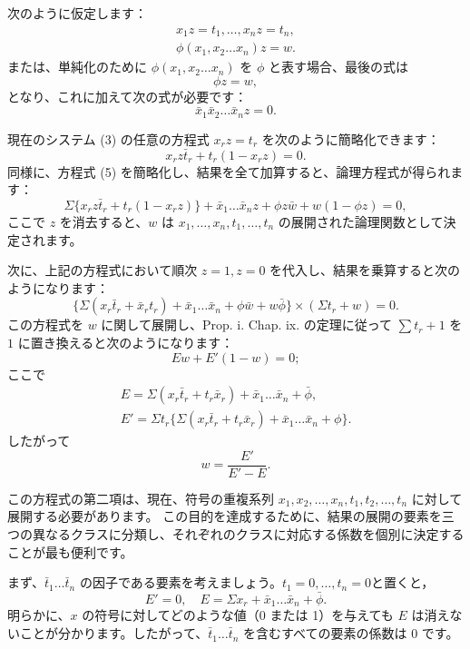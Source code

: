 \documentclass[a4paper,11pt,openany]{ltjsbook}
\begin{document}
次のように仮定します：
\begin{gather*}\tag{3}
x_1 z = t_1, \dotsc, x_n z = t_n,
\\\tag{4}
\phi(x_1, x_2 \dotsc x_n) z = w.
\end{gather*}
または、単純化のために $\phi(x_1, x_2 \dotsc x_n)$ を $\phi$ と表す場合、最後の式は
\begin{equation}\tag{5}
\phi z = w,
\end{equation}
となり、これに加えて次の式が必要です：
\begin{equation}\tag{6}
\bar{x}_1 \bar{x}_2 \dotsc \bar{x}_n z = 0.
\end{equation}

現在のシステム (3) の任意の方程式 $x_r z = t_r$ を次のように簡略化できます：
\begin{equation*}
x_r z \bar{t}_r + t_r(1 - x_r z) = 0.
\end{equation*}
同様に、方程式 (5) を簡略化し、結果を全て加算すると、論理方程式が得られます：
\[
\Sigma \{x_r z \bar{t}_r + t_r(1 - x_r z)\} + \bar{x}_1 \dotsc \bar{x}_n z + \phi z \bar{w} + w(1 - \phi z) = 0, \tag{7}
\]
ここで $z$ を消去すると、$w$ は $x_1, \dotsc, x_n, t_1, \dotsc, t_n$ の展開された論理関数として決定されます。

次に、上記の方程式において順次 $z = 1, z = 0$ を代入し、結果を乗算すると次のようになります：
\[
\{\Sigma (x_r \bar{t}_r + \bar{x}_r t_r) + \bar{x}_1 \dotsc \bar{x}_n + \phi \bar{w} + w \bar{\phi}\} \times (\Sigma t_r + w) = 0.
\]
この方程式を $w$ に関して展開し、Prop. i. Chap. ix. の定理に従って $\sum t_r + 1$ を $1$ に置き換えると次のようになります：
\[
Ew + E'(1 - w) = 0;
\]
ここで
\begin{gather*}
E = \Sigma (x_r \bar{t}_r + t_r \bar{x}_r) + \bar{x}_1 \dotsc \bar{x}_n + \bar{\phi}, \\
E' = \Sigma t_r \{\Sigma (x_r \bar{t}_r + t_r \bar{x}_r) + \bar{x}_1 \dotsc \bar{x}_n + \phi\}.
\end{gather*}
したがって
\[
w = \frac{E'}{E' - E}. \tag{8}
\]

この方程式の第二項は、現在、符号の重複系列 \( x_1, x_2, \dotsc, x_n, t_1, t_2, \dotsc, t_n \) に対して展開する必要があります。
この目的を達成するために、結果の展開の要素を三つの異なるクラスに分類し、それぞれのクラスに対応する係数を個別に決定することが最も便利です。

まず、\(\bar{t}_1 \dotsc \bar{t}_n\) の因子である要素を考えましょう。\( t_1 = 0, \dotsc, t_n = 0 \)と置くと，
\[
E' = 0,\quad E = \Sigma x_r + \bar{x}_1 \dotsc \bar{x}_n + \bar{\phi}.
\]
明らかに、\(x\) の符号に対してどのような値（0 または 1）を与えても \(E\) は消えないことが分かります。したがって、\(\bar{t}_1 \dotsc \bar{t}_n\) を含むすべての要素の係数は 0 です。
\end{document}
